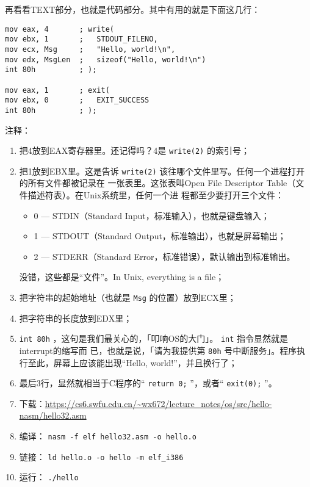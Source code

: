 \documentclass{wx672ctexart}
\begin{document}
再看看TEXT部分，也就是代码部分。其中有用的就是下面这几行：
\begin{verbatim}
mov eax, 4       ; write(
mov ebx, 1       ;   STDOUT_FILENO,
mov ecx, Msg     ;   "Hello, world!\n",
mov edx, MsgLen  ;   sizeof("Hello, world!\n")
int 80h          ; );

mov eax, 1       ; exit(
mov ebx, 0       ;   EXIT_SUCCESS
int 80h          ; );
\end{verbatim}
注释：
\begin{enumerate}
\item 把4放到EAX寄存器里。还记得吗？4是 \texttt{write(2)} 的索引号；
\item 把1放到EBX里。这是告诉 \texttt{write(2)} 该往哪个文件里写。任何一个进程打开的所有文件都被记录在
一张表里。这张表叫Open File Descriptor Table（文件描述符表）。在Unix系统里，任何一个进
程都至少要打开三个文件：
\begin{itemize}
\item 0 --- STDIN（Standard Input，标准输入），也就是键盘输入；
\item 1 --- STDOUT（Standard Output，标准输出），也就是屏幕输出；
\item 2 --- STDERR（Standard Error，标准错误），默认输出到标准输出。
\end{itemize}
没错，这些都是“文件”。In Unix, everything is a file；
\item 把字符串的起始地址（也就是 \texttt{Msg} 的位置）放到ECX里；
\item 把字符串的长度放到EDX里；
\item \texttt{int 80h} ，这句是我们最关心的，「叩响OS的大门」。 \texttt{int} 指令显然就是interrupt的缩写而
已，也就是说，「请为我提供第 \texttt{80h} 号中断服务」。程序执行至此，屏幕上应该能出现“Hello,
world!”，并且换行了；
\item 最后3行，显然就相当于C程序的“ \texttt{return 0;} ”，或者“ \texttt{exit(0);} ”。
\item 下载：\url{https://cs6.swfu.edu.cn/\~wx672/lecture\_notes/os/src/hello-nasm/hello32.asm}
\item 编译： \texttt{nasm -f elf hello32.asm -o hello.o}
\item 链接： \texttt{ld hello.o -o hello -m elf\_i386}
\item 运行： \texttt{./hello}
\end{enumerate}
\end{document}
